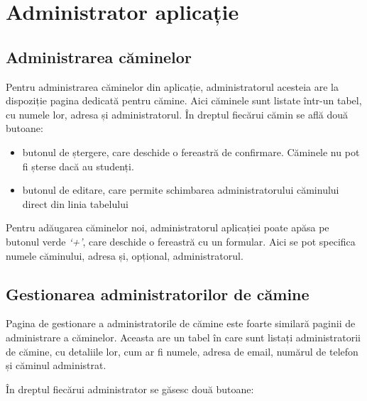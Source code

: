 \documentclass[12pt,a4paper]{report}
\theoremstyle{definition}
\theoremstyle{remark}
\begin{document}

\section{Administrator aplicație}

\subsection{Administrarea căminelor}

\par Pentru administrarea căminelor din aplicație, administratorul acesteia are la \textnormal{dis\-po\-zi\-ți\-e} pagina dedicată pentru cămine. Aici căminele sunt listate într-un tabel, cu numele lor, adresa și administratorul. În dreptul fiecărui cămin se află două butoane:

\begin{itemize}
    \item butonul de ștergere, care deschide o fereastră de confirmare. Căminele nu pot fi șterse dacă au studenți.
    \item butonul de editare, care permite schimbarea administratorului căminului direct din linia tabelului
\end{itemize}


\par Pentru adăugarea căminelor noi, administratorul aplicației poate apăsa pe butonul verde \textit{`+'}, care deschide o fereastră cu un formular. Aici se pot specifica numele căminului, adresa și, opțional, administratorul.


\subsection{Gestionarea administratorilor de cămine}

\par Pagina de gestionare a administratorile de cămine este foarte similară paginii de administrare a căminelor. Aceasta are un tabel în care sunt listați administratorii de cămine, cu detaliile lor, cum ar fi numele, adresa de email, numărul de telefon și căminul administrat.

\par În dreptul fiecărui administrator se găsesc două butoane:
\end{document}
